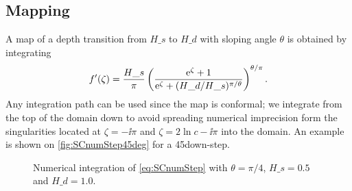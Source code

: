 \documentclass[internal]{sintefmemo}
\begin{document}
\subsection{Mapping}
A map of a depth transition from $H\_s$ to $H\_d$ with sloping angle $\theta$ is obtained by integrating
\begin{equation}
f'(\zeta) = \frac{H\_s}{\pi} \left(\frac{\mathrm{e}^\zeta+1}{\mathrm{e}^\zeta+ (H\_d/H\_s)^{\pi/\theta}}\right)^{\theta/\pi}. 
\label{eq:SCnumStep}
\end{equation}
Any integration path can be used since the map is conformal; we integrate from the top of the domain down to avoid spreading numerical imprecision form the singularities located at $\zeta=-\ii\pi$ and $\zeta=2\ln c-\ii\pi$ into the domain.
An example is shown on \autoref{fig:SCnumStep45deg} for a 45\textdegree down-step.

\begin{figure}[H]%
\centering
{}%
\hfill
{}%
\caption{Numerical integration of \eqref{eq:SCnumStep} with $\theta=\pi/4$, $H\_s = 0.5$ and $H\_d = 1.0$.}%
\label{fig:SCnumStep45deg}%
\end{figure}
\end{document}
